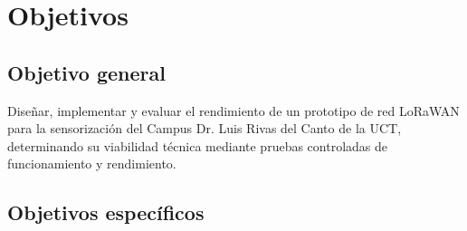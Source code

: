 \documentclass[12pt,oneside,openany,spanish,oldfontcommands]{memoir}
\begin{document}
\section{Objetivos}

\subsection{Objetivo general}

Diseñar, implementar y evaluar el rendimiento de un prototipo de red LoRaWAN para la
sensorización del Campus Dr. Luis Rivas del Canto de la UCT, determinando su viabilidad
técnica mediante pruebas controladas de funcionamiento y rendimiento.

\subsection{Objetivos específicos}
\end{document}
